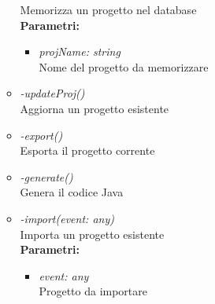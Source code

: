 \begin{itemize}
\begin{itemize}
    		Memorizza un progetto nel database\\
    		\textbf{Parametri:}
    		\begin{itemize}
    			\item \emph{projName: string}\\
    			Nome del progetto da memorizzare
    		\end{itemize}
    		\item \emph{-updateProj()}\\
    		Aggiorna un progetto esistente
    		\item \emph{-export()}\\
    		Esporta il progetto corrente
    		\item \emph{-generate()}\\
    		Genera il codice Java
    		\item \emph{-import(event: any)}\\
    		Importa un progetto esistente\\
    		\textbf{Parametri:}
    		\begin{itemize}
    			\item \emph{event: any}\\
    			Progetto da importare
    		\end{itemize}
		\end{itemize}
\end{itemize}